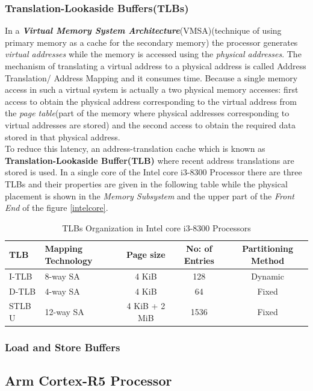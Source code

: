 \documentclass[a4paper,11pt]{article}
\begin{document}
\subsubsection{Translation-Lookaside Buffers(TLBs)}
In a \textit{\textbf{Virtual Memory System Architecture}}(VMSA)(technique of using primary memory as a cache for the secondary memory) the processor generates \textit{virtual addresses} while the memory is accessed using the \textit{physical addresses}. The mechanism of translating a virtual address to a physical address is called Address Translation/ Address Mapping and it consumes time. Because a single memory access in such a virtual system is actually a two physical memory accesses: first access to obtain the physical address corresponding to the virtual address from the \textit{page table}(part of the memory where physical addresses corresponding to virtual addresses are stored) and the second access to obtain the required data stored in that physical address.\\
To reduce this latency, an address-translation cache which is known as \textbf{Translation-Lookaside Buffer(TLB)} where recent address translations are stored is used. In a single core of the Intel core i3-8300 Processor there are three TLBs and their properties are given in the following table while the physical placement is shown in the \textit{Memory Subsystem} and the upper part of the \textit{Front End} of the figure \ref{intelcore}.


\begin{table}[!h]
	\centering
	\begin{tabular}{l |l| c| c| c}
		TLB  & Mapping Technology & Page size & No: of Entries& Partitioning Method\\
		\hline
		I-TLB & 8-way SA & 4 KiB& 128 &Dynamic\\
		D-TLB &  4-way SA & 4 KiB &64 &Fixed\\
		STLB U & 12-way SA&  4 KiB + 2 MiB & 1536 & Fixed\\
		\hline\hline
	\end{tabular}
	\caption{TLBs Organization in Intel core i3-8300 Processors}
\end{table}


\subsubsection{Load and Store Buffers}
\subsection{Arm Cortex-R5 Processor}
\end{document}
